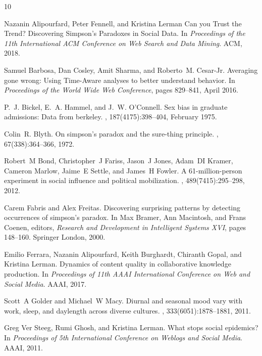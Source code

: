 \documentclass{svjour3}
\begin{document}
\begin{thebibliography}{10}

Nazanin Alipourfard, Peter Fennell, and Kristina Lerman
\newblock Can you Trust the Trend? Discovering Simpson’s Paradoxes in Social Data.
\newblock In {\em Proceedings of the 11th International ACM Conference on Web Search and Data Mining}. ACM, 2018.

Samuel Barbosa, Dan Cosley, Amit Sharma, and Roberto~M. Cesar-Jr.
\newblock Averaging gone wrong: Using {Time-Aware} analyses to better
  understand behavior.
\newblock In {\em Proceedings of the World Wide Web Conference}, pages 829--841, April 2016.

P.~J. Bickel, E.~A. Hammel, and J.~W. O'Connell.
\newblock Sex bias in graduate admissions: Data from berkeley.
, 187(4175):398--404, February 1975.

Colin~R. Blyth.
\newblock On simpson's paradox and the sure-thing principle.
,
  67(338):364--366, 1972.

Robert~M Bond, Christopher~J Fariss, Jason~J Jones, Adam~DI Kramer, Cameron
  Marlow, Jaime~E Settle, and James~H Fowler.
\newblock A 61-million-person experiment in social influence and political
  mobilization.
, 489(7415):295--298, 2012.

Carem Fabris and Alex Freitas.
\newblock Discovering surprising patterns by detecting occurrences of simpson's
  paradox.
\newblock In Max Bramer, Ann Macintosh, and Frans Coenen, editors, {\em
  Research and Development in Intelligent Systems XVI}, pages 148--160.
  Springer London, 2000.

Emilio Ferrara, Nazanin Alipourfard, Keith Burghardt, Chiranth Gopal, and
  Kristina Lerman.
\newblock Dynamics of content quality in collaborative knowledge production.
\newblock In {\em Proceedings of 11th AAAI International Conference on Web and
  Social Media}. AAAI, 2017.

Scott~A Golder and Michael~W Macy.
\newblock Diurnal and seasonal mood vary with work, sleep, and daylength across
  diverse cultures.
, 333(6051):1878--1881, 2011.

{Greg {Ver Steeg}}, Rumi Ghosh, and Kristina Lerman.
\newblock What stops social epidemics?
\newblock In {\em Proceedings of 5th International Conference on Weblogs and
  Social Media}. AAAI, 2011.


\end{thebibliography}
\end{document}
